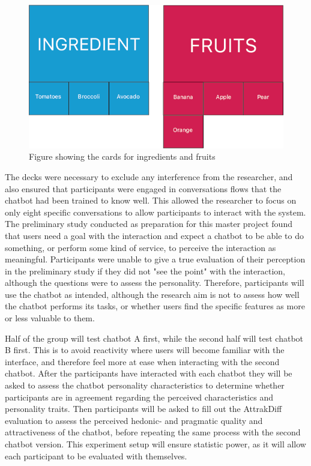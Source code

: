      \begin{figure}[h]
            \centering
            \includegraphics[scale=0.5]{figures/Ingredientfruit.png}
            \caption{Figure showing the cards for ingredients and fruits}
            \label{fig:ingfruit}
        \end{figure}

   The decks were necessary to exclude any interference from the researcher, and also ensured that participants were engaged in conversations flows that the chatbot had been trained to know well. This allowed the researcher to focus on only eight specific conversations to allow participants to interact with the system. The preliminary study conducted as preparation for this master project found that users need a goal with the interaction and expect a chatbot to be able to do something, or perform some kind of service, to perceive the interaction as meaningful. Participants were unable to give a true evaluation of their perception in the preliminary study if they did not "see the point" with the interaction, although the questions were to assess the personality. Therefore, participants will use the chatbot as intended, although the research aim is not to assess how well the chatbot performs its tasks, or whether users find the specific features as more or less valuable to them.
   
   Half of the group will test chatbot A first, while the second half will test chatbot B first. This is to avoid reactivity where users will become familiar with the interface, and therefore feel more at ease when interacting with the second chatbot. After the participants have interacted with each chatbot they will be asked to assess the chatbot personality characteristics to determine whether participants are in agreement regarding the perceived characteristics and personality traits. Then participants will be asked to fill out the AttrakDiff evaluation to assess the perceived hedonic- and pragmatic quality and attractiveness of the chatbot, before repeating the same process with the second chatbot version. This experiment setup will ensure statistic power, as it will allow each participant to be evaluated with themselves.
    

   